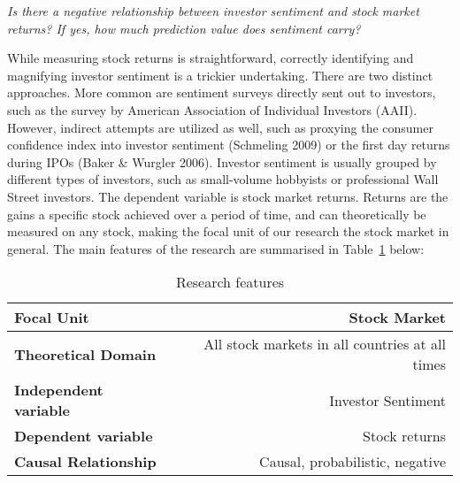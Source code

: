 \vspace{10pt}
\begin{center}
\parbox{375pt}{ \centering
\textit{Is there a negative relationship between investor sentiment and stock market returns? If yes, how much prediction value does sentiment carry?}
}
\end{center}
\vspace{10pt}

While measuring stock returns is straightforward, correctly identifying and magnifying investor sentiment is a trickier undertaking. There are two distinct approaches. More common are sentiment surveys directly sent out to investors, such as the survey by American Association of Individual Investors (AAII). However, indirect attempts are utilized as well, such as proxying the consumer confidence index into investor sentiment (Schmeling 2009) or the first day returns during IPOs (Baker \& Wurgler 2006).  Investor sentiment is usually grouped by different types of investors, such as small-volume hobbyists or professional Wall Street investors. 
The dependent variable is stock market returns. Returns are the gains a specific stock achieved over a period of time, and can theoretically be measured on any stock, making the focal unit of our research the stock market in general. The main features of the research are summarised in Table~\ref{tab:research_features} below:

\begin{table}[h]
\centering
\begin{tabular}{>{\bfseries}l | r}
Focal Unit & Stock Market \\\hline
Theoretical Domain & All stock markets in all countries at all times\\\hline
Independent variable & Investor Sentiment\\\hline
Dependent variable & Stock returns\\\hline
Causal Relationship & Causal, probabilistic, negative
\end{tabular}
\caption{\label{tab:research_features}Research features}
\end{table}

